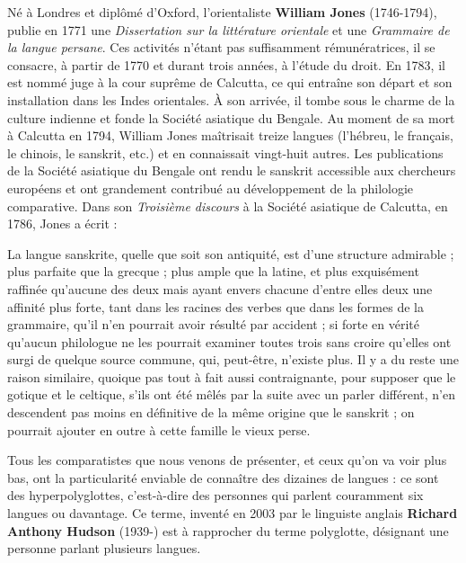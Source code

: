 Né à Londres et diplômé d’Oxford, l’orientaliste \textbf{William Jones} (1746-1794), publie en 1771 une \textit{Dissertation sur la littérature orientale} et une \textit{Grammaire de la langue persane}. Ces activités n’étant pas suffisamment rémunératrices, il se consacre, à partir de 1770 et durant trois années, à l’étude du droit. En 1783, il est nommé juge à la cour suprême de Calcutta, ce qui entraîne son départ et son installation dans les Indes orientales. À son arrivée, il tombe sous le charme de la culture indienne et fonde la Société asiatique du Bengale. Au moment de sa mort à Calcutta en 1794, William Jones maîtrisait treize langues (l’hébreu, le français, le chinois, le sanskrit, etc.) et en connaissait vingt-huit autres. Les publications de la Société asiatique du Bengale ont rendu le sanskrit accessible aux chercheurs européens et ont grandement contribué au développement de la philologie comparative. Dans son \textit{Troisième discours} à la Société asiatique de Calcutta, en 1786, Jones a écrit :

\begin{lecture}{}
La langue sanskrite, quelle que soit son antiquité, est d’une structure admirable ; plus parfaite que la grecque ; plus ample que la latine, et plus exquisément raffinée qu’aucune des deux mais ayant envers chacune d’entre elles deux une affinité plus forte, tant dans les racines des verbes que dans les formes de la grammaire, qu’il n’en pourrait avoir résulté par accident ; si forte en vérité qu’aucun philologue ne les pourrait examiner toutes trois sans croire qu’elles ont surgi de quelque source commune, qui, peut-être, n’existe plus. Il y a du reste une raison similaire, quoique pas tout à fait aussi contraignante, pour supposer que le gotique et le celtique, s’ils ont été mêlés par la suite avec un parler différent, n’en descendent pas moins en définitive de la même origine que le sanskrit ; on pourrait ajouter en outre à cette famille le vieux perse.
\end{lecture}

Tous les comparatistes que nous venons de présenter, et ceux qu’on va voir plus bas, ont la particularité enviable de connaître des dizaines de langues : ce sont des hyperpolyglottes, c’est-à-dire des personnes qui parlent couramment six langues ou davantage. Ce terme, inventé en 2003 par le linguiste anglais \textbf{Richard Anthony Hudson} (1939-) est à rapprocher du terme polyglotte, désignant une personne parlant plusieurs langues.

